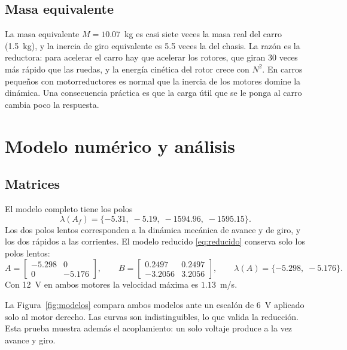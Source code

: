 \documentclass[11pt,letterpaper]{article}
\begin{document}
\subsection{Masa equivalente}
\label{sec:masa}
La masa equivalente $M = 10.07$~kg es casi siete veces la masa real del carro (1.5~kg), y la inercia de giro equivalente es 5.5 veces la del chasis. La razón es la reductora: para acelerar el carro hay que acelerar los rotores, que giran 30 veces más rápido que las ruedas, y la energía cinética del rotor crece con $N^2$. En carros pequeños con motorreductores es normal que la inercia de los motores domine la dinámica. Una consecuencia práctica es que la carga útil que se le ponga al carro cambia poco la respuesta.

\section{Modelo numérico y análisis}
\subsection{Matrices}
El modelo completo tiene los polos
\begin{equation}
  \lambda(A_f) = \{-5.31,\; -5.19,\; -1594.96,\; -1595.15\}.
\end{equation}
Los dos polos lentos corresponden a la dinámica mecánica de avance y de giro, y los dos rápidos a las corrientes. El modelo reducido \eqref{eq:reducido} conserva solo los polos lentos:
\begin{equation}
  A = \begin{bmatrix} -5.298 & 0 \\ 0 & -5.176 \end{bmatrix},\qquad
  B = \begin{bmatrix} 0.2497 & 0.2497 \\ -3.2056 & 3.2056 \end{bmatrix},\qquad
  \lambda(A) = \{-5.298,\; -5.176\}.
\end{equation}
Con 12~V en ambos motores la velocidad máxima es $1.13$~m/s.

La Figura~\ref{fig:modelos} compara ambos modelos ante un escalón de 6~V aplicado solo al motor derecho. Las curvas son indistinguibles, lo que valida la reducción. Esta prueba muestra además el acoplamiento: un solo voltaje produce a la vez avance y giro.
\end{document}
